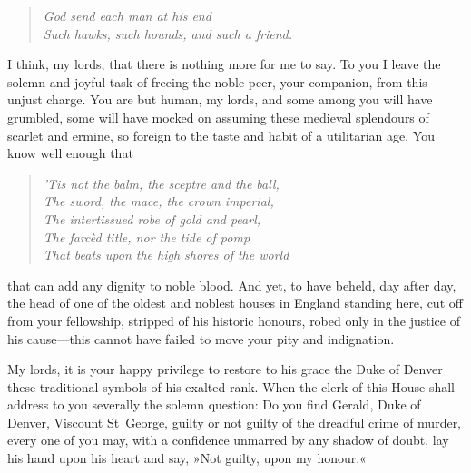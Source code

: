 \begin{dialogue}
\begin{quote}\itshape
God send each man at his end\\
Such hawks, such hounds, and such a friend.\\
\end{quote}

I think, my lords, that there is nothing more for me to say. To you I leave the solemn and joyful task of freeing the noble peer, your companion, from this unjust charge. You are but human, my lords, and some among you will have grumbled, some will have mocked on assuming these medieval splendours of scarlet and ermine, so foreign to the taste and habit of a utilitarian age. You know well enough that

\begin{quote}\itshape
'Tis not the balm, the sceptre and the ball,\\
The sword, the mace, the crown imperial,\\
The intertissued robe of gold and pearl,\\
The farcèd title, nor the tide of pomp\\
That beats upon the high shores of the world\\
\end{quote}

that can add any dignity to noble blood. And yet, to have beheld, day after day, the head of one of the oldest and noblest houses in England standing here, cut off from your fellowship, stripped of his historic honours, robed only in the justice of his cause—this cannot have failed to move your pity and indignation.

\smallskip

My lords, it is your happy privilege to restore to his grace the Duke of Denver these traditional symbols of his exalted rank. When the clerk of this House shall address to you severally the solemn question: Do you find Gerald, Duke of Denver, Viscount St~George, guilty or not guilty of the dreadful crime of murder, every one of you may, with a confidence unmarred by any shadow of doubt, lay his hand upon his heart and say, »Not guilty, upon my honour.«

\end{dialogue}
